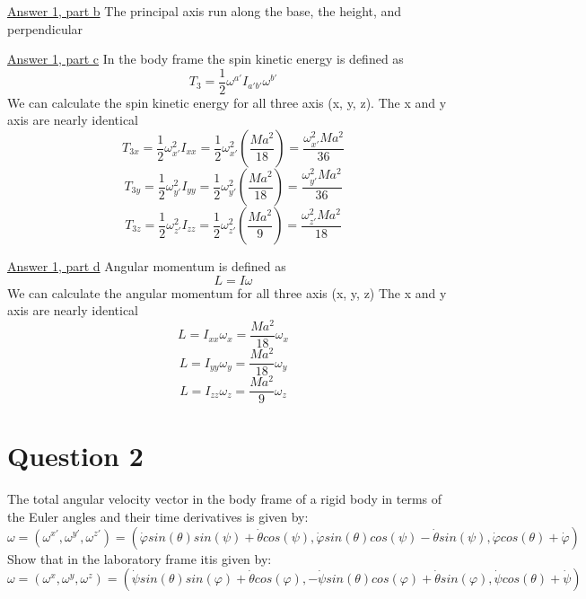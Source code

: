 \documentclass[12pt]{article}
\begin{document}
    \underline{Answer 1, part b}
    The principal axis run along the base, the height, and perpendicular 

    \underline{Answer 1, part c}
    In the body frame the spin kinetic energy is defined as 
    \[
        T_3 = \frac{1}{2} \omega^{a'} I_{a'b'} \omega^{b'}
    \]
    We can calculate the spin kinetic energy for all three axis (x, y, z).
    \newline The x and y axis are nearly identical
    \[
        T_{3x} = \frac{1}{2} \omega_{x'}^2 I_{xx} = \frac{1}{2} \omega_{x'}^2 \left(\frac{M a^2}{18} \right) = \frac{\omega_{x'}^2 M a^2}{36}
    \]
    \[
        T_{3y} = \frac{1}{2} \omega_{y'}^2 I_{yy} = \frac{1}{2} \omega_{y'}^2 \left(\frac{M a^2}{18} \right) = \frac{\omega_{y'}^2 M a^2}{36}
    \]
    \[
        T_{3z} = \frac{1}{2} \omega_{z'}^2 I_{zz} = \frac{1}{2} \omega_{z'}^2 \left(\frac{M a^2}{9} \right) = \frac{\omega_{z'}^2 M a^2}{18}
    \]
    
    \underline{Answer 1, part d}
    Angular momentum is defined as
    \[
        L = I \omega
    \]
    We can calculate the angular momentum for all three axis (x, y, z)
    \newline The x and y axis are nearly identical
    \[
        L = I_{xx} \omega_x = \frac{M a^2}{18} \omega_x
    \]
    \[
        L = I_{yy} \omega_y = \frac{M a^2}{18} \omega_y
    \]
    \[
        L = I_{zz} \omega_z = \frac{M a^2}{9} \omega_z     
    \]

\section{Question 2}
    The total angular velocity vector in the body frame of a rigid body in terms of the Euler angles and their time derivatives is given by:
    \[
        \omega = \left(\omega^{x'}, \omega^{y'}, \omega^{z'} \right) = \left(\dot{\varphi} sin(\theta) sin(\psi) + \dot{\theta} cos(\psi), \dot{\varphi} sin(\theta) cos(\psi) - \dot{\theta} sin(\psi), \dot{\varphi} cos(\theta) + \dot{\varphi} \right)
    \]
    Show that in the laboratory frame itis given by:
    \[
        \omega = \left(\omega^{x}, \omega^{y}, \omega^{z} \right) = \left(\dot{\psi} sin(\theta) sin(\varphi) + \dot{\theta} cos(\varphi), -\dot{\psi} sin(\theta) cos(\varphi) + \dot{\theta} sin(\varphi), \dot{\psi} cos(\theta) + \dot{\psi} \right)
    \]
\end{document}
